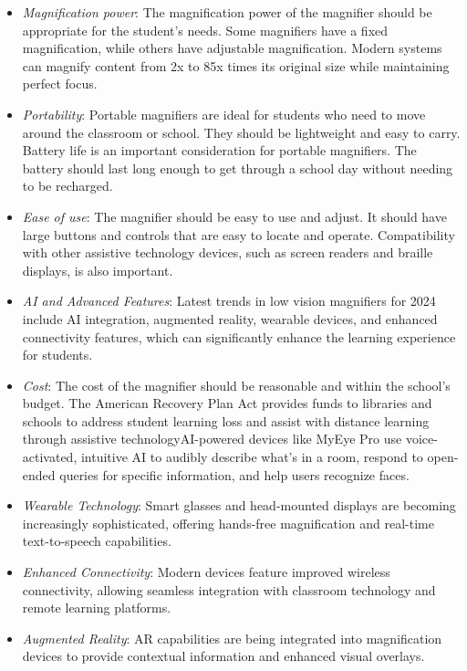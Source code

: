 \begin{itemize}
 \item \emph{Magnification power}: The magnification power of the magnifier should be appropriate for the student's needs. Some magnifiers have a fixed magnification, while others have adjustable magnification. Modern systems can magnify content from 2x to 85x times its original size while maintaining perfect focus.
 \item \emph{Portability}: Portable magnifiers are ideal for students who need to move around the classroom or school. They should be lightweight and easy to carry. Battery life is an important consideration for portable magnifiers. The battery should last long enough to get through a school day without needing to be recharged.
 \item \emph{Ease of use}: The magnifier should be easy to use and adjust. It should have large buttons and controls that are easy to locate and operate. Compatibility with other assistive technology devices, such as screen readers and braille displays, is also important.
 \item \emph{AI and Advanced Features}: Latest trends in low vision magnifiers for 2024 include AI integration, augmented reality, wearable devices, and enhanced connectivity features, which can significantly enhance the learning experience for students.
 \item \emph{Cost}: The cost of the magnifier should be reasonable and within the school's budget. The American Recovery Plan Act provides funds to libraries and schools to address student learning loss and assist with distance learning through assistive technologyAI-powered devices like MyEye Pro use voice-activated, intuitive AI to audibly describe what's in a room, respond to open-ended queries for specific information, and help users recognize faces.
 \item \emph{Wearable Technology}: Smart glasses and head-mounted displays are becoming increasingly sophisticated, offering hands-free magnification and real-time text-to-speech capabilities.
 \item \emph{Enhanced Connectivity}: Modern devices feature improved wireless connectivity, allowing seamless integration with classroom technology and remote learning platforms.
 \item \emph{Augmented Reality}: AR capabilities are being integrated into magnification devices to provide contextual information and enhanced visual overlays.
\end{itemize}

